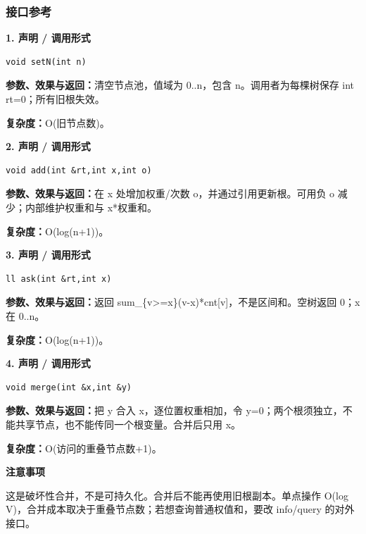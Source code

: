 \documentclass[UTF8,a4paper,10pt]{ctexart}
\newcommand{\TemplNote}[1]{\textbf{注意事项}\par #1\par}
\begin{document}
\subsubsection*{接口参考}
\noindent\begin{minipage}{\textwidth}
\textbf{1. 声明 / 调用形式}
\begin{lstlisting}
void setN(int n)
\end{lstlisting}
\textbf{参数、效果与返回：}清空节点池，值域为 0..n，包含 n。调用者为每棵树保存 int rt=0；所有旧根失效。

\textbf{复杂度：}O(旧节点数)。

\end{minipage}\par\vspace{0.4em}
\noindent\begin{minipage}{\textwidth}
\textbf{2. 声明 / 调用形式}
\begin{lstlisting}
void add(int &rt,int x,int o)
\end{lstlisting}
\textbf{参数、效果与返回：}在 x 处增加权重/次数 o，并通过引用更新根。可用负 o 减少；内部维护权重和与 x*权重和。

\textbf{复杂度：}O(log(n+1))。

\end{minipage}\par\vspace{0.4em}
\noindent\begin{minipage}{\textwidth}
\textbf{3. 声明 / 调用形式}
\begin{lstlisting}
ll ask(int &rt,int x)
\end{lstlisting}
\textbf{参数、效果与返回：}返回 sum\_\{v>=x\}(v-x)*cnt[v]，不是区间和。空树返回 0；x 在 0..n。

\textbf{复杂度：}O(log(n+1))。

\end{minipage}\par\vspace{0.4em}
\noindent\begin{minipage}{\textwidth}
\textbf{4. 声明 / 调用形式}
\begin{lstlisting}
void merge(int &x,int &y)
\end{lstlisting}
\textbf{参数、效果与返回：}把 y 合入 x，逐位置权重相加，令 y=0；两个根须独立，不能共享节点，也不能传同一个根变量。合并后只用 x。

\textbf{复杂度：}O(访问的重叠节点数+1)。

\TemplNote{这是破坏性合并，不是可持久化。合并后不能再使用旧根副本。单点操作 O(log V)，合并成本取决于重叠节点数；若想查询普通权值和，要改 info/query 的对外接口。}
\end{minipage}\par\vspace{0.4em}
\end{document}
